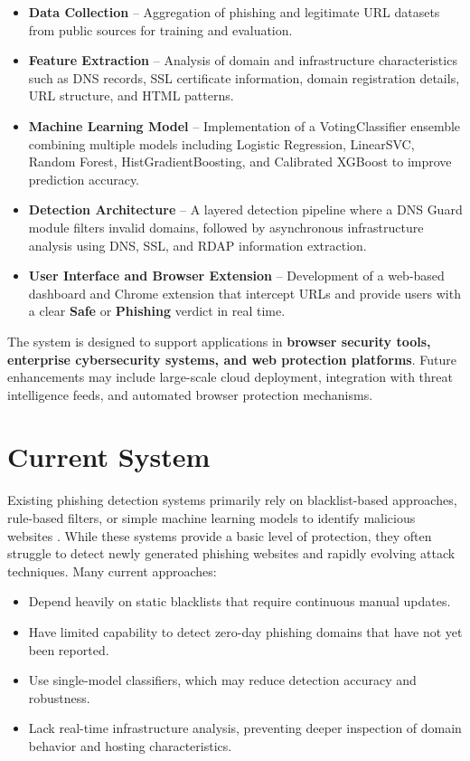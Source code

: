 \begin{itemize}
\item \textbf{Data Collection} -- Aggregation of phishing and legitimate URL datasets from public sources for training and evaluation.

\item \textbf{Feature Extraction} -- Analysis of domain and infrastructure characteristics such as DNS records, SSL certificate information, domain registration details, URL structure, and HTML patterns.

\item \textbf{Machine Learning Model} -- Implementation of a VotingClassifier ensemble combining multiple models including Logistic Regression, LinearSVC, Random Forest, HistGradientBoosting, and Calibrated XGBoost to improve prediction accuracy.

\item \textbf{Detection Architecture} -- A layered detection pipeline where a DNS Guard module filters invalid domains, followed by asynchronous infrastructure analysis using DNS, SSL, and RDAP information extraction.

\item \textbf{User Interface and Browser Extension} -- Development of a web-based dashboard and Chrome extension that intercept URLs and provide users with a clear \textbf{Safe} or \textbf{Phishing} verdict in real time.
\end{itemize}

The system is designed to support applications in \textbf{browser security tools, enterprise cybersecurity systems, and web protection platforms}. Future enhancements may include large-scale cloud deployment, integration with threat intelligence feeds, and automated browser protection mechanisms.

\section{Current System}

Existing phishing detection systems primarily rely on blacklist-based approaches, rule-based filters, or simple machine learning models to identify malicious websites \cite{ref3, ref6}. While these systems provide a basic level of protection, they often struggle to detect newly generated phishing websites and rapidly evolving attack techniques.
Many current approaches:

\begin{itemize}
\item Depend heavily on static blacklists that require continuous manual updates.

\item Have limited capability to detect zero-day phishing domains that have not yet been reported.

\item Use single-model classifiers, which may reduce detection accuracy and robustness.

\item Lack real-time infrastructure analysis, preventing deeper inspection of domain behavior and hosting characteristics.
\end{itemize}

